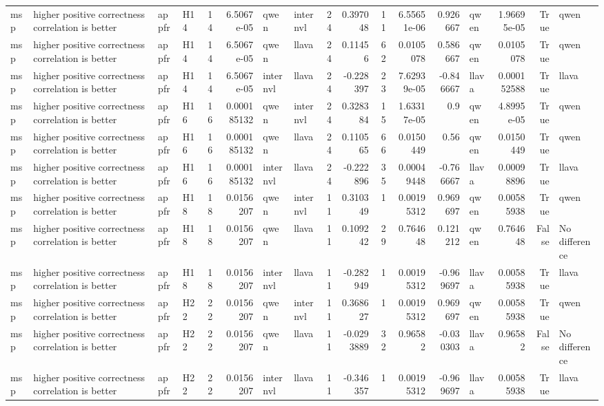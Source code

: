 \begin{longtable}{llllrrllrrrrrlrrl}
msp & higher positive correctness correlation is better & appfr & H14 & 14 & 6.5067e-05 & qwen & internvl & 24 & 0.397048 & 11 & 6.55651e-06 & 0.926667 & qwen & 1.96695e-05 & True & qwen \\
msp & higher positive correctness correlation is better & appfr & H14 & 14 & 6.5067e-05 & qwen & llava & 24 & 0.11456 & 62 & 0.0105078 & 0.586667 & qwen & 0.0105078 & True & qwen \\
msp & higher positive correctness correlation is better & appfr & H14 & 14 & 6.5067e-05 & internvl & llava & 24 & -0.228397 & 23 & 7.62939e-05 & -0.846667 & llava & 0.000152588 & True & llava \\
msp & higher positive correctness correlation is better & appfr & H16 & 16 & 0.000185132 & qwen & internvl & 24 & 0.328384 & 15 & 1.63317e-05 & 0.9 & qwen & 4.8995e-05 & True & qwen \\
msp & higher positive correctness correlation is better & appfr & H16 & 16 & 0.000185132 & qwen & llava & 24 & 0.110565 & 66 & 0.0150449 & 0.56 & qwen & 0.0150449 & True & qwen \\
msp & higher positive correctness correlation is better & appfr & H16 & 16 & 0.000185132 & internvl & llava & 24 & -0.222896 & 35 & 0.00049448 & -0.766667 & llava & 0.00098896 & True & llava \\
msp & higher positive correctness correlation is better & appfr & H18 & 18 & 0.0156207 & qwen & internvl & 11 & 0.310349 & 1 & 0.00195312 & 0.969697 & qwen & 0.00585938 & True & qwen \\
msp & higher positive correctness correlation is better & appfr & H18 & 18 & 0.0156207 & qwen & llava & 11 & 0.109242 & 29 & 0.764648 & 0.121212 & qwen & 0.764648 & False & No difference \\
msp & higher positive correctness correlation is better & appfr & H18 & 18 & 0.0156207 & internvl & llava & 11 & -0.282949 & 1 & 0.00195312 & -0.969697 & llava & 0.00585938 & True & llava \\
msp & higher positive correctness correlation is better & appfr & H22 & 22 & 0.0156207 & qwen & internvl & 11 & 0.368627 & 1 & 0.00195312 & 0.969697 & qwen & 0.00585938 & True & qwen \\
msp & higher positive correctness correlation is better & appfr & H22 & 22 & 0.0156207 & qwen & llava & 11 & -0.0293889 & 32 & 0.96582 & -0.030303 & llava & 0.96582 & False & No difference \\
msp & higher positive correctness correlation is better & appfr & H22 & 22 & 0.0156207 & internvl & llava & 11 & -0.346357 & 1 & 0.00195312 & -0.969697 & llava & 0.00585938 & True & llava \\

\end{longtable}
